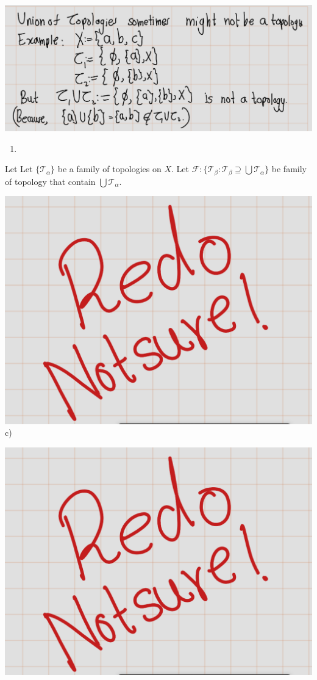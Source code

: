 \documentclass[
]{book}
\providecommand{\tightlist}{%
  \setlength{\itemsep}{0pt}\setlength{\parskip}{0pt}}
\theoremstyle{definition}
\theoremstyle{definition}
\theoremstyle{definition}
\theoremstyle{definition}
\theoremstyle{remark}
\begin{document}
\includegraphics{figures/Exercises/Ex 2.13/ex-4-2.png}

\begin{enumerate}
\def\labelenumi{\alph{enumi})}
\setcounter{enumi}{1}
\tightlist
\item
\end{enumerate}

Let Let \(\{\mathcal{T}_\alpha\}\) be a family of topologies on \(X\).
Let \(\mathcal{F}:\{\mathcal{T}_\beta: \mathcal{T}_\beta\supseteq \bigcup \mathcal{T}_\alpha\}\) be family of topology that contain \(\bigcup\mathcal{T}_\alpha\).

\includegraphics{figures/Exercises/Ex 2.17/Notsure.png}
c)

\includegraphics{figures/Exercises/Ex 2.17/Notsure.png}
\end{document}
